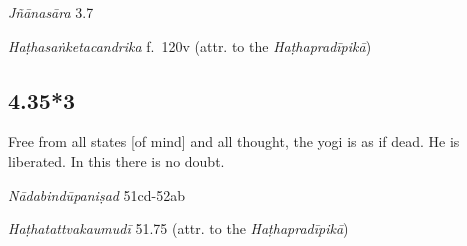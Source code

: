 \begin{ekdosis}
\begin{sources}[hp04_035_2]
\emph{Jñānasāra} 3.7
\begin{versinnote}
\end{versinnote}
\end{sources}

\begin{testimonia}[hp04_035_2]
\emph{Haṭhasaṅketacandrika} f.~120v (attr. to the \emph{Haṭhapradīpikā})
\begin{versinnote}
\end{versinnote}

\end{testimonia}


\subsection*{4.35*3}
\begin{translation}[hp04_035_3]
Free from all states [of mind] and all thought, the yogi is as if dead. He is liberated. In this there is no doubt.
\end{translation}


\begin{testimonia}[hp04_035_3]
\emph{Nādabindūpaniṣad} 51cd-52ab
\begin{versinnote}
\end{versinnote}

\emph{Haṭhatattvakaumudī} 51.75 (attr. to the \emph{Haṭhapradīpikā})
\begin{versinnote}
\end{versinnote}
\end{testimonia}


\end{ekdosis}
